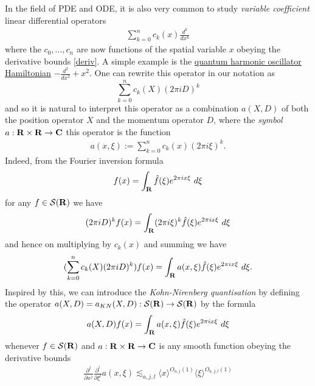 \documentclass[11pt]{article}
\theoremstyle{definition}
\begin{document}
In the field of PDE and ODE, it is also very common to study \emph{variable coefficient} linear differential operators 
\begin{align}\label{ckk}
  \sum_{k=0}^n c_k(x) \frac{d^k}{dx^k} 
\end{align}
 where the \({c_0,\dots,c_n}\) are now functions of the spatial variable \({x}\) obeying the derivative bounds \eqref{deriv}. A simple example is the \href{https://en.wikipedia.org/wiki/Quantum_harmonic_oscillator}{quantum harmonic oscillator Hamiltonian} \({-\frac{d^2}{dx^2} + x^2}\). One can rewrite this operator in our notation as 
\[\displaystyle  \sum_{k=0}^n c_k(X) (2\pi i D)^k\]
 and so it is natural to interpret this operator as a combination \({a(X,D)}\) of both the position operator \({X}\) and the momentum operator \({D}\), where the \emph{symbol} \({a: {\bf R} \times {\bf R} \rightarrow {\bf C}}\) this operator is the function 
\begin{align}\label{akk}
  a(x,\xi) := \sum_{k=0}^n c_k(x) (2\pi i \xi)^k. 
\end{align}
 Indeed, from the Fourier inversion formula 
\[\displaystyle  f(x) = \int_{\bf R} \hat f(\xi) e^{2\pi i x \xi}\ d\xi\]
 for any \({f \in {\mathcal S}({\bf R})}\) we have 
\[\displaystyle  (2\pi i D)^k f(x) = \int_{\bf R} (2\pi i \xi)^k \hat f(\xi) e^{2\pi i x \xi}\ d\xi\]
 and hence on multiplying by \({c_k(x)}\) and summing we have 
\[\displaystyle (\sum_{k=0}^n c_k(X) (2\pi i D)^k) f(x) = \int_{\bf R} a(x,\xi) \hat f(\xi) e^{2\pi i x \xi}\ d\xi.\]
 Inspired by this, we can introduce the \emph{Kohn-Nirenberg quantisation} by defining the operator \({a(X,D) = a_{KN}(X,D): {\mathcal S}({\bf R}) \rightarrow {\mathcal S}({\bf R})}\) by the formula 
\begin{align}\label{axd}
  a(X,D) f(x) = \int_{\bf R} a(x,\xi) \hat f(\xi) e^{2\pi i x \xi}\ d\xi 
\end{align}
 whenever \({f \in {\mathcal S}({\bf R})}\) and \({a: {\bf R} \times {\bf R} \rightarrow {\bf C}}\) is any smooth function obeying the derivative bounds 
\begin{align}\label{deriv-2}
  \frac{\partial^j}{\partial x^j} \frac{\partial^l}{\partial \xi^l} a(x,\xi) \lesssim_{a,j,l} \langle x \rangle^{O_{a,j}(1)} \langle \xi \rangle^{O_{a,j,l}(1)} 
\end{align}
\end{document}
